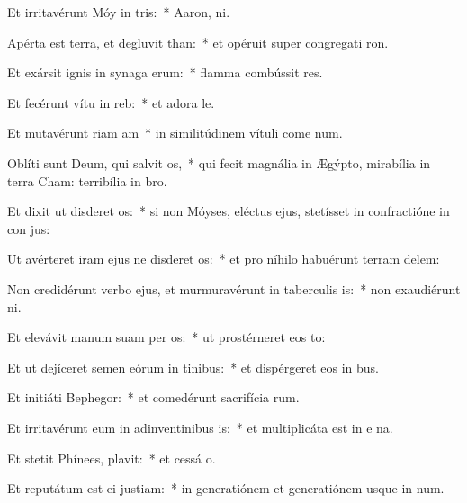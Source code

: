 \item Et irritavérunt Móy in tris:~* Aaron,  ni.
\item Apérta est terra, et degluvit than:~* et opéruit super congregati ron.
\item Et exársit ignis in synaga erum:~* flamma combússit res.
\item Et fecérunt vítu in reb:~* et adora le.
\item Et mutavérunt riam am~* in similitúdinem vítuli come num.
\item Oblíti sunt Deum, qui salvit os,~* qui fecit magnália in Ægýpto, mirabília in terra Cham: terribília in  bro.
\item Et dixit ut disderet os:~* si non Móyses, eléctus ejus, stetísset in confractióne in con jus:
\item Ut avérteret iram ejus ne disderet os:~* et pro níhilo habuérunt terram delem:
\item Non credidérunt verbo ejus, et murmuravérunt in taberculis is:~* non exaudiérunt  ni.
\item Et elevávit manum suam per os:~* ut prostérneret eos  to:
\item Et ut dejíceret semen eórum in tinibus:~* et dispérgeret eos in bus.
\item Et initiáti  Bephegor:~* et comedérunt sacrifícia rum.
\item Et irritavérunt eum in adinventinibus is:~* et multiplicáta est in e na.
\item Et stetit Phínees,  plavit:~* et cessá o.
\item Et reputátum est ei  justiam:~* in generatiónem et generatiónem usque in num.
